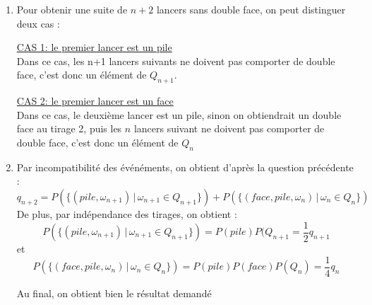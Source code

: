 \documentclass[a4paper, 11pt,reqno]{article}
\begin{document}
\begin{correction}
\begin{enumerate}
\begin{enumerate}
\item Pour obtenir une suite de $n+2$ lancers sans double face, on peut distinguer deux cas : 

\underline{CAS 1: le premier lancer est un pile}\\
Dans ce cas, les n+1 lancers suivants ne doivent pas comporter de double face, c'est donc un élément de $Q_{n+1}$.

\underline{CAS 2: le premier lancer est un face}\\
Dans ce cas, le deuxième lancer est un pile, sinon on obtiendrait un double face au tirage 2, puis les $n$ lancers suivant ne doivent pas comporter de double face, c'est donc un élément de $Q_{n}$

\item Par incompatibilité des événéments, on obtient d'après la question précédente : 
$$q_{n+2}  = P(\{ (pile,\omega_{n+1} ) \, |\, \omega_{n+1}\in Q_{n+1}\})  +P( \{ (face,pile,\omega_{n} ) \, |\, \omega_{n}\in Q_{n}\} )$$
De plus, par indépendance des tirages, on obtient : 
$$P(\{ (pile,\omega_{n+1} ) \, |\, \omega_{n+1}\in Q_{n+1}\})= P(pile) P(Q_{n+1} = \frac{1}{2}q_{n+1}$$
et 
$$P(\{ (face, pile,\omega_{n} ) \, |\, \omega_{n}\in Q_{n}\})= P(pile)P(face) P(Q_{n} )= \frac{1}{4}q_{n}$$

Au final, on obtient bien le résultat demandé 


\end{enumerate}
\end{enumerate}
\end{correction}
\end{document}
